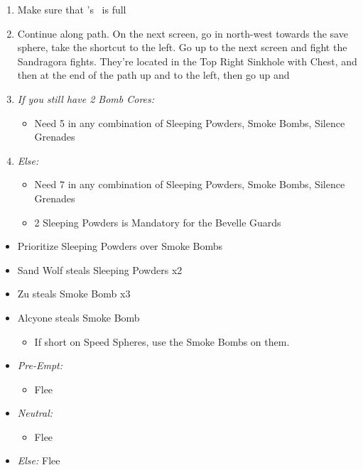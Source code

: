 \begin{enumerate}[resume]
	\item Make sure that \rikku's \od\ is full
	\item Continue along path. On the next screen, go in north-west towards the save sphere, take the shortcut to the left. Go up to the next screen and fight the Sandragora fights. They're located in the Top Right Sinkhole with Chest, and then at the end of the path up and to the left, then go up and \sd
	\item \textit{If you still have 2 Bomb Cores:}
	      \begin{itemize}
		      \item Need 5 in any combination of Sleeping Powders, Smoke Bombs, Silence Grenades
	      \end{itemize}
	\item \textit{Else:}
	      \begin{itemize}
		      \item Need 7 in any combination of Sleeping Powders, Smoke Bombs, Silence Grenades
		      \item 2 Sleeping Powders is Mandatory for the Bevelle Guards
	      \end{itemize}
\end{enumerate}
\begin{encounters}
	\begin{itemize}
		\item Prioritize Sleeping Powders over Smoke Bombs
		\item Sand Wolf steals Sleeping Powders x2
		\item Zu steals Smoke Bomb x3
		\item Alcyone steals Smoke Bomb
		      \begin{itemize}
			      \item If short on Speed Spheres, use the Smoke Bombs on them.
		      \end{itemize}
		\item \textit{Pre-Empt:}
		      \begin{itemize}
			      \tidusf Defend
			      \rikkuf Steal
			      \auronf Defend
			      \item Flee
		      \end{itemize}
		\item \textit{Neutral:}
		      \begin{itemize}
			      \switch{\tidus}{\kimahri}
			      \kimahrif Steal
			      \switch{\rikku}{\tidus}
			      \item Flee
		      \end{itemize}
		\item \textit{Else:} Flee
	\end{itemize}
\end{encounters}

